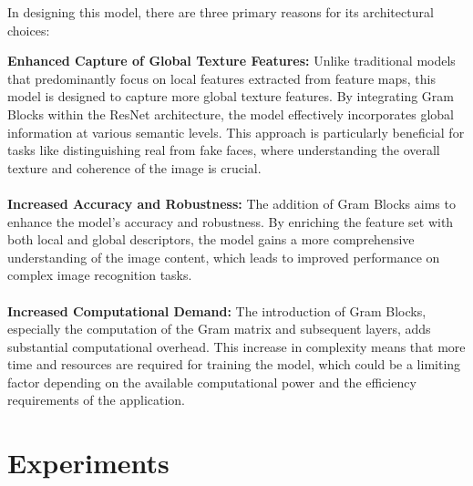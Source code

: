 \documentclass[rebuttal]{cvpr}
\begin{document}
In designing this model, there are three primary reasons for its architectural choices:  

\textbf{Enhanced Capture of Global Texture Features:} Unlike traditional models that predominantly focus on local features extracted from feature maps, this model is designed to capture more global texture features. By integrating Gram Blocks within the ResNet architecture, the model effectively incorporates global information at various semantic levels. This approach is particularly beneficial for tasks like distinguishing real from fake faces, where understanding the overall texture and coherence of the image is crucial.
\\
\\
\textbf{Increased Accuracy and Robustness:} The addition of Gram Blocks aims to enhance the model's accuracy and robustness. By enriching the feature set with both local and global descriptors, the model gains a more comprehensive understanding of the image content, which leads to improved performance on complex image recognition tasks.
\\
\\
\textbf{Increased Computational Demand:} The introduction of Gram Blocks, especially the computation of the Gram matrix and subsequent layers, adds substantial computational overhead. This increase in complexity means that more time and resources are required for training the model, which could be a limiting factor depending on the available computational power and the efficiency requirements of the application.

\section{Experiments}
\end{document}
